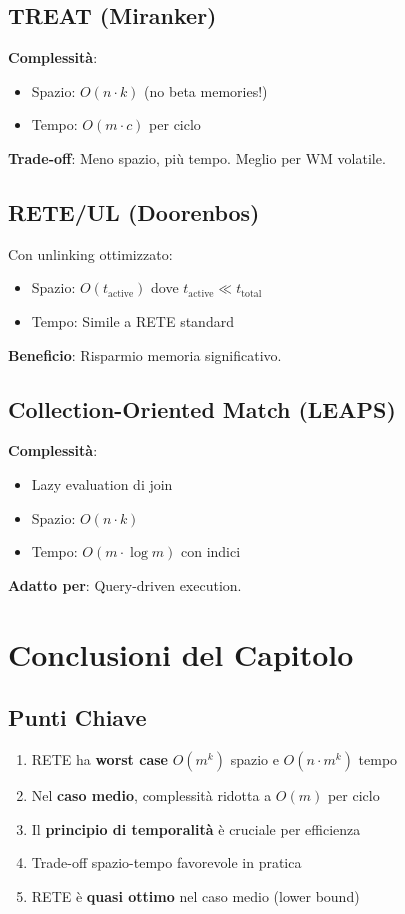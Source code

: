 \subsection{TREAT (Miranker)}

\textbf{Complessità}:
\begin{itemize}
\item Spazio: $O(n \cdot k)$ (no beta memories!)
\item Tempo: $O(m \cdot c)$ per ciclo
\end{itemize}

\textbf{Trade-off}: Meno spazio, più tempo. Meglio per WM volatile.

\subsection{RETE/UL (Doorenbos)}

Con unlinking ottimizzato:
\begin{itemize}
\item Spazio: $O(t_{\text{active}})$ dove $t_{\text{active}} \ll t_{\text{total}}$
\item Tempo: Simile a RETE standard
\end{itemize}

\textbf{Beneficio}: Risparmio memoria significativo.

\subsection{Collection-Oriented Match (LEAPS)}

\textbf{Complessità}:
\begin{itemize}
\item Lazy evaluation di join
\item Spazio: $O(n \cdot k)$
\item Tempo: $O(m \cdot \log m)$ con indici
\end{itemize}

\textbf{Adatto per}: Query-driven execution.

\section{Conclusioni del Capitolo}

\subsection{Punti Chiave}

\begin{enumerate}
\item RETE ha \textbf{worst case} $O(m^k)$ spazio e $O(n \cdot m^k)$ tempo
\item Nel \textbf{caso medio}, complessità ridotta a $O(m)$ per ciclo
\item Il \textbf{principio di temporalità} è cruciale per efficienza
\item Trade-off spazio-tempo favorevole in pratica
\item RETE è \textbf{quasi ottimo} nel caso medio (lower bound)
\end{enumerate}

